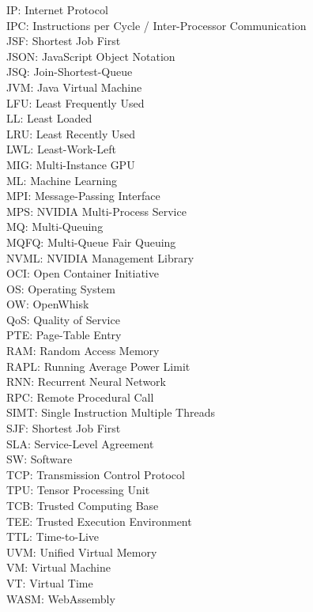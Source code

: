 IP: Internet Protocol \\
IPC: Instructions per Cycle / Inter-Processor Communication \\
JSF: Shortest Job First \\
JSON: JavaScript Object Notation \\
JSQ: Join-Shortest-Queue \\
JVM: Java Virtual Machine \\
LFU: Least Frequently Used \\
LL: Least Loaded \\
LRU: Least Recently Used \\
LWL: Least-Work-Left \\
MIG: Multi-Instance GPU \\
ML: Machine Learning \\
MPI: Message-Passing Interface \\
MPS: NVIDIA Multi-Process Service \\
MQ: Multi-Queuing \\
MQFQ: Multi-Queue Fair Queuing \\
NVML: NVIDIA Management Library \\
OCI: Open Container Initiative \\
OS: Operating System \\
OW: OpenWhisk \\
QoS: Quality of Service \\
PTE: Page-Table Entry \\
RAM: Random Access Memory \\
RAPL: Running Average Power Limit \\
RNN: Recurrent Neural Network \\
RPC: Remote Procedural Call \\
SIMT: Single Instruction Multiple Threads \\
SJF: Shortest Job First \\
SLA: Service-Level Agreement \\
SW: Software \\
TCP: Transmission Control Protocol \\
TPU: Tensor Processing Unit \\
TCB: Trusted Computing Base \\
TEE: Trusted Execution Environment \\
TTL: Time-to-Live \\
UVM: Unified Virtual Memory \\
VM: Virtual Machine \\
VT: Virtual Time \\
WASM: WebAssembly \\


